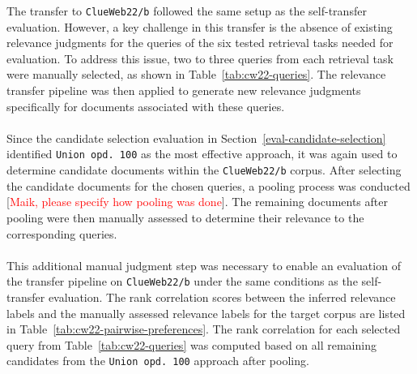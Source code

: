 The transfer to \texttt{ClueWeb22/b} followed the same setup as the self-transfer evaluation. However, a key challenge in this transfer is the absence of existing relevance judgments for the queries of the six tested retrieval tasks needed for evaluation. To address this issue, two to three queries from each retrieval task were manually selected, as shown in Table~\ref{tab:cw22-queries}. The relevance transfer pipeline was then applied to generate new relevance judgments specifically for documents associated with these queries.
\\\\
Since the candidate selection evaluation in Section~\ref{eval-candidate-selection} identified \linebreak \mbox{\texttt{Union opd.\ 100}} as the most effective approach, it was again used to determine candidate documents within the \texttt{ClueWeb22/b} corpus. After selecting the candidate documents for the chosen queries, a pooling process was conducted [\textcolor{red}{Maik, please specify how pooling was done}]. The remaining documents after pooling were then manually assessed to determine their relevance to the corresponding queries.
\\\\
This additional manual judgment step was necessary to enable an evaluation of the transfer pipeline on \texttt{ClueWeb22/b} under the same conditions as the self-transfer evaluation. The rank correlation scores between the inferred relevance labels and the manually assessed relevance labels for the target corpus are listed in Table~\ref{tab:cw22-pairwise-preferences}. The rank correlation for each selected query from Table~\ref{tab:cw22-queries} was computed based on all remaining candidates from the \texttt{Union opd.\ 100} approach after pooling.

